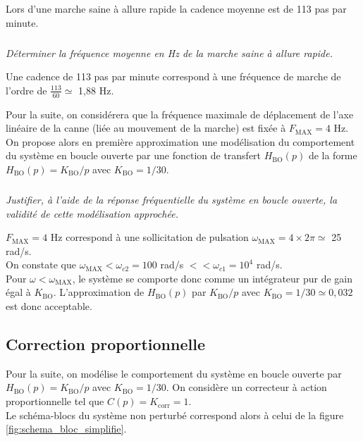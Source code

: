 \begin{multicols}{2}
\ifprof
\else

Lors d'une marche saine à allure rapide la cadence moyenne est de 113 pas par minute.
\fi

\subparagraph{}\textit{Déterminer la fréquence moyenne en Hz de la marche saine à allure rapide.}

\ifprof
\begin{corrige}
Une cadence de 113 pas par minute correspond à une fréquence de marche de l'ordre de $\frac{113}{60} \simeq $ 1,88 Hz.
 \end{corrige}
\fi

\ifprof
\else
\vspace*{1em}
Pour la suite, on considérera que la fréquence maximale de déplacement de l'axe linéaire de  la canne (liée au mouvement de la marche) est fixée à $F_{\text{MAX}} = 4$ Hz. On propose alors en première approximation une modélisation du comportement du système en boucle ouverte par une fonction de transfert $H_{\text{BO}}(p)$ de la forme $H_{\text{BO}}(p) = K_{\text{BO}}/p$ avec $K_{\text{BO}} = 1/30$.
\fi

\subparagraph{}\textit{Justifier, à l'aide de la réponse fréquentielle du système en boucle ouverte, la validité de cette modélisation approchée.}

\ifprof
\begin{corrige}
$F_{\text{MAX}} = 4$ Hz correspond à une sollicitation de pulsation $\omega_{\text{MAX}} = 4 \times 2 \pi \simeq $ 25 rad/s. \\
On constate que $\omega_{\text{MAX}}  <  \omega_{c2} = 100$ rad/s $<< \omega_{c1} = 10^{4}$ rad/s. \\
Pour $\omega < \omega_{\text{MAX}}$, le système se comporte donc comme un intégrateur pur de gain égal à $K_{\text{BO}}$. L'approximation de $H_{\text{BO}}(p)$ par $K_{\text{BO}}/p$ avec $K_{\text{BO}} = 1/30 \simeq 0,032$ est donc acceptable.
\end{corrige}
\fi

\ifprof
\else
\subsection*{Correction proportionnelle}

Pour la suite, on modélise le comportement du système en boucle ouverte par $H_{\text{BO}}(p) = K_{\text{BO}}/p$ avec $K_{\text{BO}} = 1/30$. On considère un correcteur à action proportionnelle tel que $C(p) = K_{\text{corr}} = 1$. \\
Le schéma-blocs du système non perturbé correspond alors à celui de la figure \ref{fig:schema_bloc_simplifie}.


\end{multicols}
